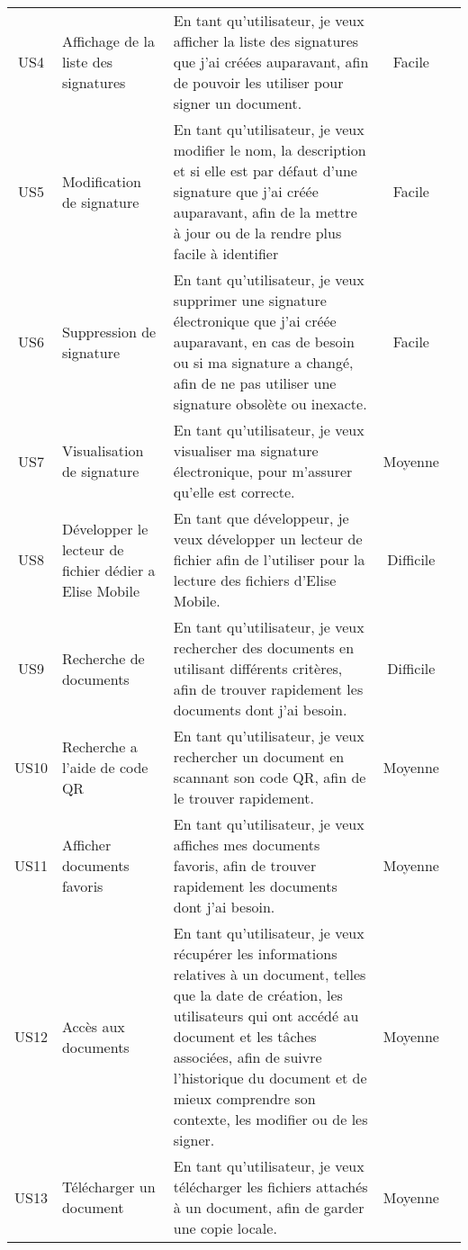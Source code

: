 \begin{landscape}
\begin{adjustwidth}{-1cm}{}
\begin{longtable}{|c|p{5cm}|p{12cm}|c|c|}
    \cline{1-4}
    US4 & Affichage de la liste des signatures & En tant qu'utilisateur, je veux afficher la liste des signatures que j'ai créées auparavant, afin de pouvoir les utiliser pour signer un document. & Facile &  \\

    \cline{1-4}
    US5 & Modification de signature & En tant qu'utilisateur, je veux modifier le nom, la description et si elle est par défaut d'une signature que j'ai créée auparavant, afin de la mettre à jour ou de la rendre plus facile à identifier & Facile & \\
    \cline{1-4}
    US6 & Suppression de signature & En tant qu'utilisateur, je veux supprimer une signature électronique que j'ai créée auparavant, en cas de besoin ou si ma signature a changé, afin de ne pas utiliser une signature obsolète ou inexacte. & Facile & \\

    \cline{1-4}
    US7 & Visualisation de signature & En tant qu'utilisateur, je veux visualiser ma signature électronique, pour m'assurer qu'elle est correcte. & Moyenne & \\
    \cline{1-4}
    US8 & Développer le lecteur de fichier dédier a Elise Mobile & En tant que développeur, je veux développer un lecteur de fichier afin de l'utiliser pour la lecture des fichiers d'Elise Mobile. & Difficile & \\
    \cline{1-4}

    US9&Recherche de documents&En tant qu'utilisateur, je veux rechercher des documents en utilisant différents critères, afin de trouver rapidement les documents dont j'ai besoin.&Difficile&\\

    \cline{1-4}
    US10&Recherche a l'aide de code QR&En tant qu'utilisateur, je veux rechercher un document en scannant son code QR, afin de le trouver rapidement.&Moyenne&\\
    \cline{1-4}
    US11&Afficher documents favoris&En tant qu'utilisateur, je veux affiches mes documents favoris, afin de trouver rapidement les documents dont j'ai besoin. &Moyenne&\\

    \cline{1-4}
    US12&Accès aux documents&En tant qu'utilisateur, je veux récupérer les informations relatives à un document, telles que la date de création, les utilisateurs qui ont accédé au document et les tâches associées, afin de suivre l'historique du document et de mieux comprendre son contexte, les modifier ou de les signer.&Moyenne&\\
    \cline{1-4}
    US13&Télécharger un document&En tant qu'utilisateur, je veux télécharger les fichiers attachés à un document, afin de garder une copie locale.&Moyenne&\\


\end{longtable}
\end{adjustwidth}
\end{landscape}
